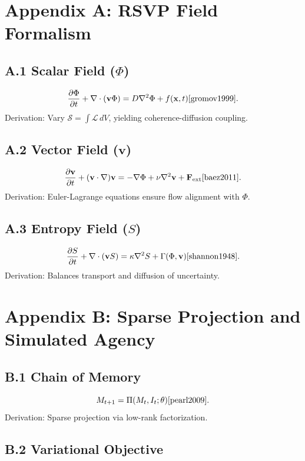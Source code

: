 \documentclass[12pt]{article}
\begin{document}
{{{{{{{{{{{{{{{{{\appendix

\section{Appendix A: RSVP Field Formalism}

\subsection{A.1 Scalar Field (\(\Phi\))}

\[
\frac{\partial \Phi}{\partial t} + \nabla \cdot (\mathbf{v} \Phi) = D \nabla^2 \Phi + f(\mathbf{x}, t) \cite{gromov1999}.
\]
Derivation: Vary \(\mathcal{S} = \int \mathcal{L} \, dV\), yielding coherence-diffusion coupling.

\subsection{A.2 Vector Field (\(\mathbf{v}\))}

\[
\frac{\partial \mathbf{v}}{\partial t} + (\mathbf{v} \cdot \nabla)\mathbf{v} = -\nabla \Phi + \nu \nabla^2 \mathbf{v} + \mathbf{F}_{\text{ext}} \cite{baez2011}.
\]
Derivation: Euler-Lagrange equations ensure flow alignment with \(\Phi\).

\subsection{A.3 Entropy Field (\(S\))}

\[
\frac{\partial S}{\partial t} + \nabla \cdot (\mathbf{v} S) = \kappa \nabla^2 S + \Gamma(\Phi, \mathbf{v}) \cite{shannon1948}.
\]
Derivation: Balances transport and diffusion of uncertainty.

\section{Appendix B: Sparse Projection and Simulated Agency}

\subsection{B.1 Chain of Memory}

\[
M_{t+1} = \Pi(M_t, I_t; \theta) \cite{pearl2009}.
\]
Derivation: Sparse projection via low-rank factorization.

\subsection{B.2 Variational Objective}

}}}}}}}}}}}}}}}}}
\end{document}
